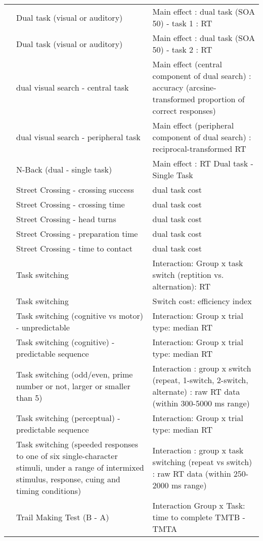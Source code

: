 \documentclass[
]{book}
\begin{document}
\begin{tabular}{l|l|l}
\cline{2-3}
 & Dual task (visual or auditory) & Main effect : dual task (SOA 50) - task 1 : RT\\
\cline{2-3}
 & Dual task (visual or auditory) & Main effect : dual task (SOA 50) - task 2 : RT\\
\cline{2-3}
 & dual visual search - central task & Main effect (central component of dual search) : accuracy (arcsine-transformed proportion of correct responses)\\
\cline{2-3}
 & dual visual search - peripheral task & Main effect (peripheral component of dual search) : reciprocal-transformed RT\\
\cline{2-3}
 & N-Back (dual - single task) & Main effect : RT Dual task - Single Task\\
\cline{2-3}
 & Street Crossing - crossing success & dual task cost\\
\cline{2-3}
 & Street Crossing - crossing time & dual task cost\\
\cline{2-3}
 & Street Crossing - head turns & dual task cost\\
\cline{2-3}
 & Street Crossing - preparation time & dual task cost\\
\cline{2-3}
 & Street Crossing - time to contact & dual task cost\\
\cline{2-3}
 & Task switching & Interaction: Group x  task switch (reptition vs. alternation): RT\\
\cline{2-3}
 & Task switching & Switch cost: efficiency index\\
\cline{2-3}
 & Task switching (cognitive vs motor) - unpredictable & Interaction: Group x trial type: median RT\\
\cline{2-3}
 & Task switching (cognitive) - predictable sequence & Interaction: Group x trial type: median RT\\
\cline{2-3}
 & Task switching (odd/even, prime number or not, larger or smaller than 5) & Interaction : group x switch (repeat, 1-switch, 2-switch, alternate) : raw RT data (within 300-5000 ms range)\\
\cline{2-3}
 & Task switching (perceptual) - predictable sequence & Interaction: Group x trial type: median RT\\
\cline{2-3}
 & Task switching (speeded responses to one of six single-character stimuli, under a range of intermixed stimulus, response, cuing and timing conditions) & Interaction : group x task switching (repeat vs switch) : raw RT data (within 250-2000 ms range)\\
\cline{2-3}
 & Trail Making Test (B - A) & Interaction Group x Task: time to complete TMTB - TMTA\\

\end{tabular}
\end{document}
